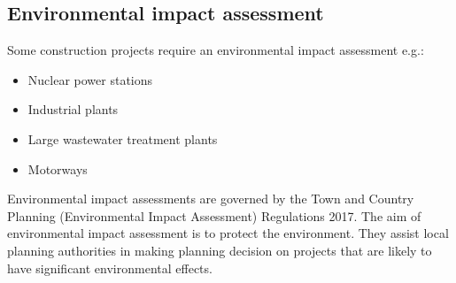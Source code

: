\subsection{Environmental impact assessment}
Some construction projects require an environmental impact assessment e.g.:
\begin{itemize}
    \item Nuclear power stations
    \item Industrial plants
    \item Large wastewater treatment plants
    \item Motorways
\end{itemize}
Environmental impact assessments are governed by the Town and Country Planning (Environmental Impact Assessment) Regulations 2017. The aim of environmental impact assessment is to protect the environment. They assist local planning authorities in making planning decision on projects that are likely to have significant environmental effects.


